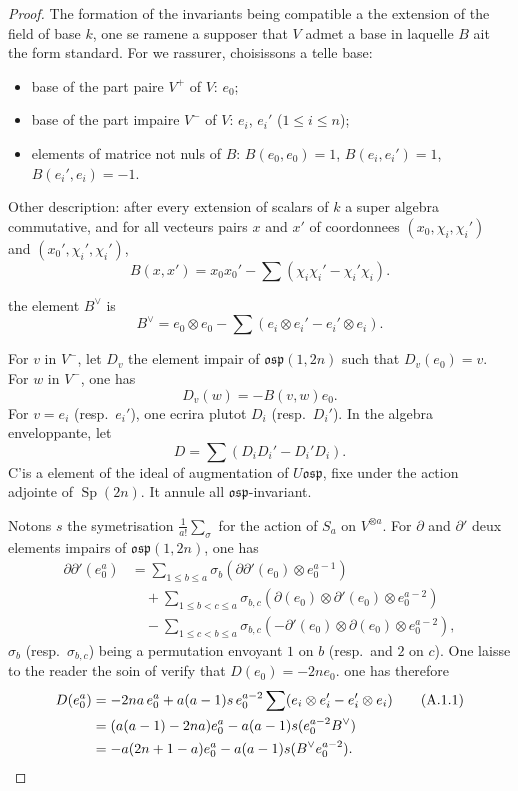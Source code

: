 \documentclass[11pt,a4paper]{article}
\theoremstyle{plain}
\theoremstyle{definition}
\DeclareMathOperator{\Sp}{Sp}
\begin{document}
\begin{proof}
The formation of the invariants being compatible a the extension of the field of base $k$, one se ramene a supposer that $V$ admet a base in laquelle $B$ ait the form standard. For we rassurer, choisissons a telle base:
\begin{itemize}[label={},leftmargin=*]
\item base of the part paire $V^+$ of $V$: $e_0$;
\item base of the part impaire $V^-$ of $V$: $e_i$, $e_i'$ ($1 \leq i \leq n$);
\item elements of matrice not nuls of $B$: $B(e_0, e_0) = 1$, $B(e_i, e_i') = 1$, $B(e_i', e_i) = -1$.
\end{itemize}

Other description: after every extension of scalars of $k$ a super algebra commutative, and for all vecteurs pairs $x$ and $x'$ of coordonnees $(x_0, \chi_i, \chi_i')$ and $(x_0', \chi_i', \chi_i')$,
\[
B(x, x') = x_0 x_0' - \sum (\chi_i \chi_i' - \chi_i' \chi_i).
\]

the element $B^\vee$ is
\[
B^\vee = e_0 \otimes e_0 - \sum (e_i \otimes e_i' - e_i' \otimes e_i).
\]

For $v$ in $V^-$, let $D_v$ the element impair of $\mathfrak{osp}(1, 2n)$ such that $D_v(e_0) = v$. For $w$ in $V^-$, one has
\[
D_v(w) = -B(v, w) e_0.
\]
For $v = e_i$ (resp.~$e_i'$), one ecrira plutot $D_i$ (resp.~$D_i'$). In the algebra enveloppante, let
\[
D = \sum (D_i D_i' - D_i' D_i).
\]
C'is a element of the ideal of augmentation of $U\mathfrak{osp}$, fixe under the action adjointe of $\Sp(2n)$. It annule all $\mathfrak{osp}$-invariant.

Notons $s$ the symetrisation $\frac{1}{a!} \sum_\sigma$ for the action of $S_a$ on $V^{\otimes a}$. For $\partial$ and $\partial'$ deux elements impairs of $\mathfrak{osp}(1, 2n)$, one has
\begin{align*}
\partial \partial' (e_0^a) &= \sum_{1 \leq b \leq a} \sigma_b(\partial \partial' (e_0) \otimes e_0^{a-1}) \\
&\quad + \sum_{1 \leq b < c \leq a} \sigma_{b,c}(\partial(e_0) \otimes \partial'(e_0) \otimes e_0^{a-2}) \\
&\quad - \sum_{1 \leq c < b \leq a} \sigma_{b,c}(-\partial'(e_0) \otimes \partial(e_0) \otimes e_0^{a-2}),
\end{align*}
$\sigma_b$ (resp.~$\sigma_{b,c}$) being a permutation envoyant $1$ on $b$ (resp.~and $2$ on $c$). One laisse to the reader the soin of verify that $D(e_0) = -2n e_0$. one has therefore
\begin{align}
D(e_0^a) &= -2na \, e_0^a + a(a-1) s \, e_0^{a-2} \sum (e_i \otimes e_i' - e_i' \otimes e_i) \tag{A.1.1} \\
&= (a(a-1) - 2na) e_0^a - a(a-1) s(e_0^{a-2} B^\vee) \notag \\
&= -a(2n + 1 - a) e_0^a - a(a-1) s(B^\vee e_0^{a-2}). \notag
\end{align}


\end{proof}
\end{document}
